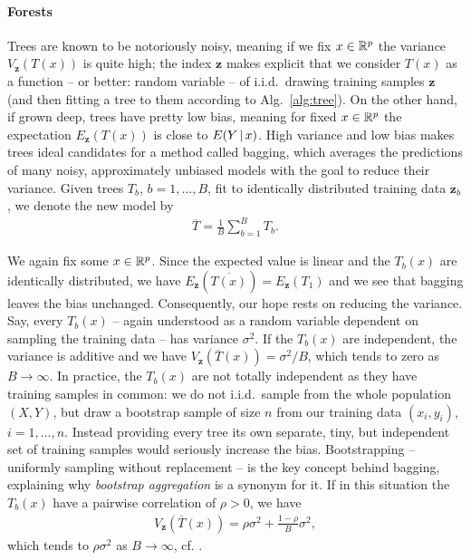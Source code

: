 \paragraph{Forests}
Trees are known to be notoriously noisy, meaning if we fix $x \in \mathbb{R}^p$ the variance 
$V_\mathbf{z}(T(x))$ is quite high; the index $\mathbf{z}$ makes explicit that we consider $T(x)$ as 
a function -- or better: random variable -- of i.i.d.\ drawing training samples $\mathbf{z}$ (and 
then fitting a tree to them according to Alg.\ \ref{alg:tree}). On the other hand, if grown deep,
trees have pretty low bias, meaning for fixed $x \in \mathbb{R}^p$ the expectation $E_\mathbf{z}(T(x))$ 
is close to $E(Y \,|\, x)$. High variance and low bias makes trees 
ideal candidates for a method called bagging, which averages the predictions of many noisy, 
approximately unbiased models with the goal to reduce their variance. Given trees $T_b$, $b = 1, 
\ldots, B$, fit to identically distributed training data $\mathbf{z}_b$, we denote the new model by 
\begin{align}
    \overline{T} = \frac{1}{B} \sum_{b=1}^B T_b.
\end{align}

We again fix some $x \in \mathbb{R}^p$. Since the expected value is linear and the $T_b(x)$ are identically 
distributed, we have $E_\mathbf{z}(\overline{T(x)}) = E_\mathbf{z}(T_1)$ and we see that bagging 
leaves the bias unchanged. Consequently, our hope rests on reducing the variance. Say, every 
$T_b(x)$ -- again understood as a random variable dependent on sampling the training data -- has 
variance $\sigma^2$. If the $T_b(x)$ are independent, the variance is additive and we have 
$V_\mathbf{z}(\overline{T}(x)) = \sigma^2/B$, which tends to zero as $B \to \infty$. In practice, 
the $T_b(x)$ are not totally independent as they have training samples in common: we do not i.i.d.\ 
sample from the whole population $(X, Y)$, but draw a bootstrap sample of size $n$ from our training 
data $(x_i, y_i)$, $i = 1, \ldots, n$. Instead providing every 
tree its own separate, tiny, but independent set of training samples would seriously increase the 
bias. Bootstrapping -- uniformly sampling without replacement -- is the key concept behind bagging, 
explaining why \textit{bootstrap aggregation} is a synonym for it. If in this 
situation the $T_b(x)$ have a pairwise correlation of $\rho > 0$, we have 
\begin{align}
    V_\mathbf{z}\left(\overline{T}(x)\right) = \rho \sigma^2 + \frac{1-\rho}{B} \sigma^2,
\end{align}
which tends to $\rho \sigma^2$ as $B \to \infty$, cf. \cite[Eq. (15.1)]{elem-stat-learn01}.

